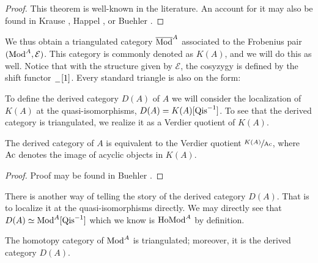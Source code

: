\documentclass[../thesis.tex]{subfiles}
\begin{document}
            \begin{proof}
                This theorem is well-known in the literature. An account for it may also be found in Krause \cite{Krause21}, Happel \cite{Happel88}, or Buehler \cite{Buhler10}.
            \end{proof}

            We thus obtain a triangulated category $\overline{\tt{Mod}}^A$ associated to the Frobenius pair $(\tt{Mod}^A, \mathcal{E})$. This category is commonly denoted as $K(A)$, and we will do this as well. Notice that with the structure given by $\mathcal{E}$, the cosyzygy is defined by the shift functor $\argument [1]$. Every standard triangle is also on the form:

            \begin{center}
            \end{center}

            To define the derived category $D(A)$ of $A$ we will consider the localization of $K(A)$ at the quasi-isomorphisms, $D(A) = K(A)[\tt{Qis}^{-1}]$. To see that the derived category is triangulated, we realize it as a Verdier quotient of $K(A)$.

            \begin{proposition}
                The derived category of $A$ is equivalent to the Verdier quotient $\sfrac{K(A)}{\tt{Ac}}$, where $\tt{Ac}$ denotes the image of acyclic objects in $K(A)$.
            \end{proposition}

            \begin{proof}
                Proof may be found in Buehler \cite{Buhler10}.
            \end{proof}

            There is another way of telling the story of the derived category $D(A)$. That is to localize it at the quasi-isomorphisms directly. We may directly see that $D(A) \simeq \tt{Mod}^A[\tt{Qis}^{-1}]$ which we know is $\tt{Ho} \tt{Mod}^A$ by definition.

            \begin{thm}
                The homotopy category of $\tt{Mod}^A$ is triangulated; moreover, it is the derived category $D(A)$.
            \end{thm}
\end{document}

